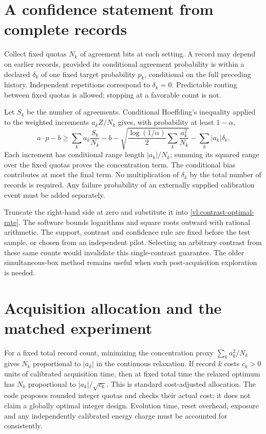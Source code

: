 \section{A confidence statement from complete records}
Collect fixed quotas $N_k$ of agreement bits at each setting. A record may
depend on earlier records, provided its conditional agreement probability is
within a declared $\delta_k$ of one fixed target probability $p_k$, conditional
on the full preceding history. Independent repetitions correspond to
$\delta_k=0$. Predictable routing between fixed quotas is allowed; stopping at
a favorable count is not.

Let $S_k$ be the number of agreements. Conditional Hoeffding's inequality
applied to the weighted increments $a_k Z/N_k$ gives, with probability at
least $1-\alpha$,
\begin{equation}
 a\cdot p-b\geq
 \sum_k a_k\frac{S_k}{N_k}-b
 -\sqrt{\frac{\log(1/\alpha)}2\sum_k\frac{a_k^2}{N_k}}
 -\sum_k|a_k|\delta_k.
 \label{vl:contrast-confidence}
\end{equation}
Each increment has conditional range length $|a_k|/N_k$; summing its squared
range over the fixed quotas proves the concentration term. The conditional
bias contributes at most the final term. No multiplication of $\delta_k$ by
the total number of records is required. Any failure probability of an
externally supplied calibration event must be added separately.

Truncate the right-hand side at zero and substitute it into
\eqref{vl:contrast-optimal-rate}. The software bounds logarithms and square
roots outward with rational arithmetic. The support, contrast and confidence
rule are fixed before the test sample, or chosen from an independent pilot.
Selecting an arbitrary contrast from these same counts would invalidate this
single-contrast guarantee. The older simultaneous-box method remains useful
when such post-acquisition exploration is needed.

\section{Acquisition allocation and the matched experiment}
For a fixed total record count, minimizing the concentration proxy
$\sum_k a_k^2/N_k$ gives $N_k$ proportional to $|a_k|$ in the continuous
relaxation. If record $k$ costs $c_k>0$ units of calibrated acquisition time,
then at fixed total time the relaxed optimum has
$N_k$ proportional to $|a_k|/\sqrt{c_k}$. This is standard cost-adjusted
allocation. The code proposes rounded integer quotas and checks their actual
cost; it does not claim a globally optimal integer design. Evolution time,
reset overhead, exposure and any independently calibrated energy charge must
be accounted for consistently.

